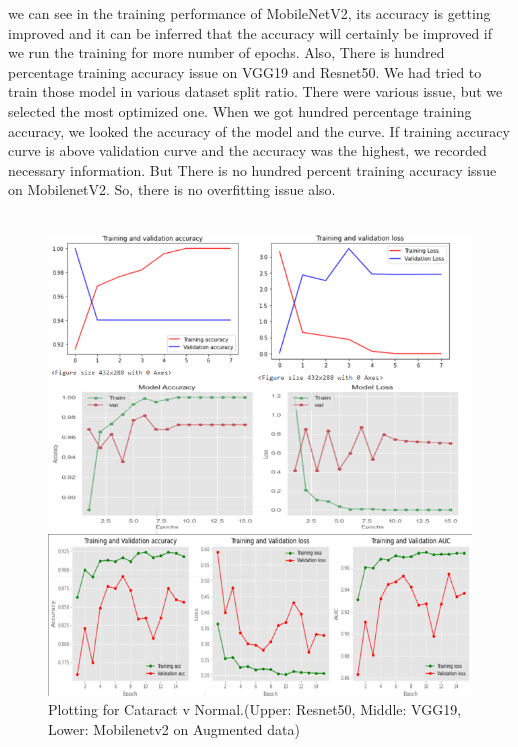 \vspace{5pt}
we can see in the training performance of MobileNetV2, its accuracy is getting improved and it can be inferred that the accuracy will certainly be improved if we run the training for more number of epochs. Also, There is hundred percentage training accuracy issue on VGG19  and Resnet50. We had tried to train those model in various dataset split ratio. There were various issue, but we selected the most optimized one. When we got hundred percentage training accuracy, we looked the accuracy of the model and the curve. If training accuracy curve is above validation curve and the accuracy was the highest, we recorded necessary information. But There is no hundred percent training accuracy issue on MobilenetV2. So, there is no overfitting issue also.\\
\\
\begin{figure}[H]
    \centering
    \includegraphics[scale=0.7]{c1.png}
    \caption{Plotting for Cataract v Normal.(Upper: Resnet50, Middle: VGG19, Lower: Mobilenetv2 on Augmented data)}
    \label{Plotting for Cataract v Normal}
\end{figure}
\vspace{5pt}
\\
